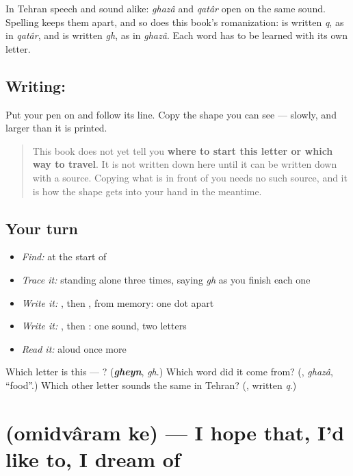 In Tehran speech \textbf{} and \textbf{} sound alike: \emph{ghazâ} and \emph{qatâr} open on the same sound. Spelling keeps them apart, and so does this book's romanization: \textbf{} is written \emph{q}, as in \emph{qatâr}, and \textbf{} is written \emph{gh}, as in \emph{ghazâ}. Each word has to be learned with its own letter.

\subsection*{Writing: }
Put your pen on  and follow its line. Copy the shape you can see — slowly, and larger than it is printed.

\begin{quote}
This book does not yet tell you \textbf{where to start this letter or which way to travel}. It is not written down here until it can be written down with a source. Copying what is in front of you needs no such source, and it is how the shape gets into your hand in the meantime.
\end{quote}

\subsection*{Your turn}
\begin{itemize}
\raggedright
  \item \emph{Find:}  at the start of \textbf{}
  \item \emph{Trace it:}  standing alone three times, saying \emph{gh} as you finish each one
  \item \emph{Write it:} , then , from memory: one dot apart
  \item \emph{Write it:} \textbf{}, then \textbf{}: one sound, two letters
  \item \emph{Read it:} \textbf{} aloud once more
\end{itemize}

\begin{tcolorbox}[breakable,colback=teal!4,colframe=teal!35!black,title={Before you move on}]
Which letter is this — ? (\emph{\textbf{gheyn}}, \emph{gh}.) Which word did it come from? (\textbf{}, \emph{ghazâ}, \textquotedblleft{}food\textquotedblright{}.) Which other letter sounds the same in Tehran? (\textbf{}, written \emph{q}.)
\end{tcolorbox}
\section[\texorpdfstring{\fa{امیدوارم} \fa{که} (omidvâram ke)}{امیدوارم که (omidvâram ke)}]{  (omidvâram ke) — I hope that, I'd like to, I dream of}

